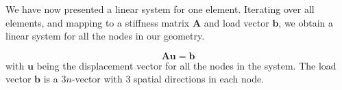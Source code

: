 We have now presented a linear system for one element. Iterating over all elements, and mapping to a stiffness matrix $\bm{A}$ and load vector $\bm{b}$, we obtain a linear system for all the nodes in our geometry. 

\begin{equation}
\bm{A} \bm{u} = \bm{b}
\end{equation}
with $\bm{u}$ being the displacement vector for all the nodes in the system. The load vector $\bm{b}$ is a $3n$-vector with 3 spatial directions in each node.